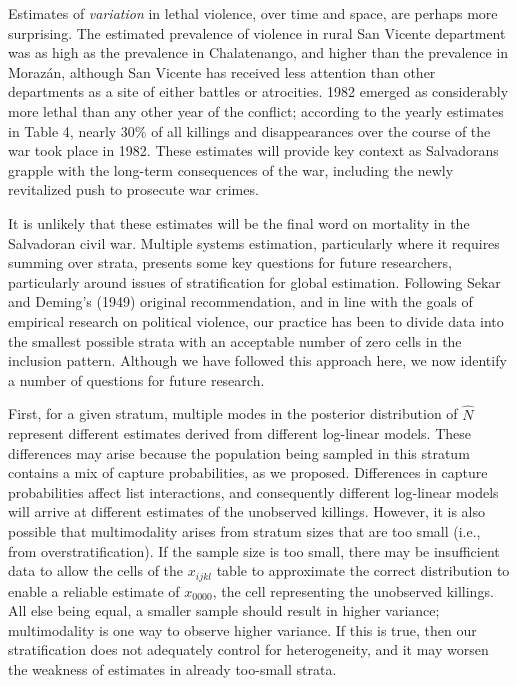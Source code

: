 \documentclass[11pt,]{article}
\begin{document}
Estimates of \emph{variation} in lethal violence, over time and space,
are perhaps more surprising. The estimated prevalence of violence in
rural San Vicente department was as high as the prevalence in
Chalatenango, and higher than the prevalence in Morazán, although San
Vicente has received less attention than other departments as a site of
either battles or atrocities. 1982 emerged as considerably more lethal
than any other year of the conflict; according to the yearly estimates
in Table 4, nearly 30\% of all killings and disappearances over the
course of the war took place in 1982. These estimates will provide key
context as Salvadorans grapple with the long-term consequences of the
war, including the newly revitalized push to prosecute war crimes.

It is unlikely that these estimates will be the final word on mortality
in the Salvadoran civil war. Multiple systems estimation, particularly
where it requires summing over strata, presents some key questions for
future researchers, particularly around issues of stratification for
global estimation. Following Sekar and Deming's (1949) original
recommendation, and in line with the goals of empirical research on
political violence, our practice has been to divide data into the
smallest possible strata with an acceptable number of zero cells in the
inclusion pattern. Although we have followed this approach here, we now
identify a number of questions for future research.

First, for a given stratum, multiple modes in the posterior distribution
of \(\hat{N}\) represent different estimates derived from different
log-linear models. These differences may arise because the population
being sampled in this stratum contains a mix of capture probabilities,
as we proposed. Differences in capture probabilities affect list
interactions, and consequently different log-linear models will arrive
at different estimates of the unobserved killings. However, it is also
possible that multimodality arises from stratum sizes that are too small
(i.e., from overstratification). If the sample size is too small, there
may be insufficient data to allow the cells of the \(x_{ijkl}\) table to
approximate the correct distribution to enable a reliable estimate of
\(x_{0000}\), the cell representing the unobserved killings. All else
being equal, a smaller sample should result in higher variance;
multimodality is one way to observe higher variance. If this is true,
then our stratification does not adequately control for heterogeneity,
and it may worsen the weakness of estimates in already too-small strata.
\end{document}
